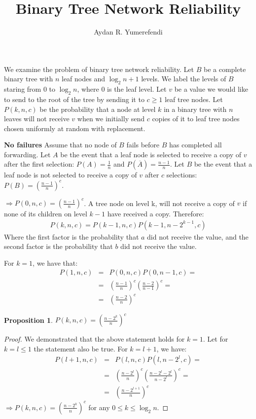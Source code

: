 \documentclass[10pt]{style}
\title {Binary Tree Network Reliability}
\author {Aydan R. Yumerefendi}
\theoremstyle{plain}
\newtheorem{prop}[thm]{Proposition}
\theoremstyle{definition}
\theoremstyle{remark}
\numberwithin{equation}{section}
\begin{document}
  \maketitle

  We examine the problem of binary tree network reliability. Let $B$
  be a complete binary tree with $n$ leaf nodes and $\log_2{n}+1$
  levels. We label the levels of $B$ staring from 0 to $\log_2n$, where 0 is the leaf
  level. Let $v$ be a value we would like to send to the root of the
  tree by sending it to $c \geq 1$ leaf tree nodes. Let $P(k,n,c)$ be
  the probability that a node at level $k$ in a binary tree with $n$
  leaves will not receive $v$ when we initially send $c$ copies of it
  to leaf tree nodes chosen uniformly at random with replacement.

  {\bf No failures}
  Assume that no node of $B$ fails before $B$ has completed all
  forwarding. Let $A$ be the event that a leaf node is selected to
  receive a copy of $v$ after the first selection: $P(A) =
  \frac{1}{n}$ and $P(\overline{A}) = \frac{n-1}{n}$. Let $B$ be the
  event that a leaf node is not selected to receive a copy of $v$
  after $c$ selections: $P(B) = (\frac{n-1}{n})^c$. 

  \noindent $\Rightarrow P(0,n,c)= (\frac{n-1}{n})^c$.
  A tree node on level k, will not receive a copy of $v$ if none of
  its children on level $k-1$ have received a copy. Therefore:
  \begin{eqnarray*}
    P(k,n,c) = P(k-1,n,c)P(k-1, n-2^{k-1},c)
  \end{eqnarray*}
  Where the first factor is the probability that $a$ did not receive
  the value, and the second factor is the probability that $b$ did not
  receive the value.

  For $k =1$, we have that:
  \begin{eqnarray*}
    P(1, n,c) &=& P(0, n,c)P(0, n-1,c) = \\
    &=&(\frac{n-1}{n})^c(\frac{n-2}{n-1})^c=\\
    &=&(\frac{n-2}{n})^c
  \end{eqnarray*}

  \begin{prop}
    $P(k,n,c) = (\frac{n-2^k}{n})^c$
  \end{prop}

  \begin{proof}
    We demonstrated that the above statement holds for $k=1$. Let
    for $k=l \leq 1$ the statement also be true. For $k=l+1$, we have:
    \begin{eqnarray*}
      P(l+1,n,c) &=& P(l,n,c)P(l, n-2^{l},c) = \\
      &=& (\frac{n-2^l}{n})^c(\frac{n-2^{l}-2^{l}}{n-2^l})^c =\\
      &=& (\frac{n-2^{l+1}}{n})^c
    \end{eqnarray*}
    $\Rightarrow P(k,n,c) = (\frac{n-2^k}{n})^c$ for any $0 \leq k
    \leq \log_2n$. 
  \end{proof}
\end{document}
